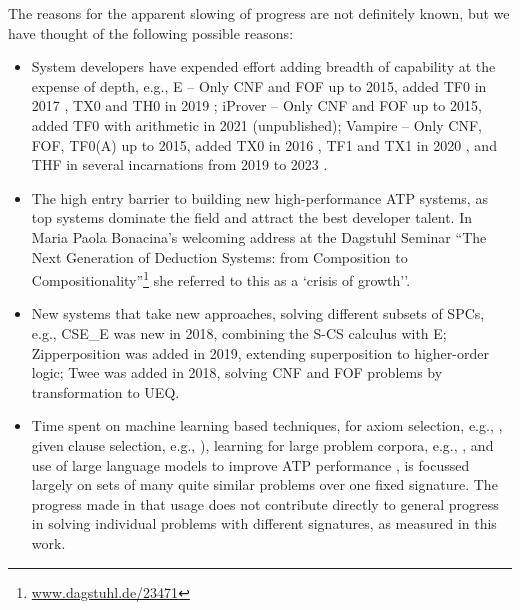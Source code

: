\documentclass[runningheads]{llncs}
\begin{document}
The reasons for the apparent slowing of progress are not definitely known, but we have thought of 
the following possible reasons:
\begin{itemize}
\item System developers have expended effort adding breadth of capability at the expense of 
      depth, e.g., 
      E -- Only CNF and FOF up to 2015, added TF0 in 2017 \cite{SCV19}, TX0 and TH0 in 2019 
           \cite{VB+19};
      iProver -- Only CNF and FOF up to 2015, added TF0 with arithmetic in 2021 (unpublished);
      Vampire -- Only CNF, FOF, TF0(A) up to 2015, added TX0 in 2016 \cite{KK+16}, 
           TF1 and TX1 in 2020 \cite{BR20-IJCAR}, and THF in several incarnations from 2019 to 
           2023 \cite{BR19,Bha20-Thesis,BRS23}.
\item The high entry barrier to building new high-performance ATP systems, as top systems
      dominate the field and attract the best developer talent.
      In Maria Paola Bonacina's welcoming address at the Dagstuhl Seminar ``The Next Generation 
      of Deduction Systems: from Composition to Compositionality''\footnote{%
      \href{https://www.dagstuhl.de/23471}{www.dagstuhl.de/23471}} she referred to this as a
     `crisis of growth''.
\item New systems that take new approaches, solving different subsets of SPCs, e.g.,
      CSE\_E \cite{XL+18} was new in 2018, combining the S-CS calculus with E;
      Zipperposition \cite{BB+21} was added in 2019, extending superposition to higher-order logic;
      Twee \cite{Sma21} was added in 2018, solving CNF and FOF problems by transformation to UEQ.
\item Time spent on machine learning based techniques, for axiom selection, e.g., 
      \cite{Urb06,KB14}, given clause selection, e.g., \cite{JU17-CICM,CA+21,AA+22-ML,MS23}), 
      learning for large problem corpora, e.g., \cite{KM+14,JU19,BL+19-ICML}, 
      and use of large language models to improve ATP performance \cite{WX+23,AS+23},
      is focussed largely on sets of many quite similar problems over one fixed signature.
      The progress made in that usage does not contribute directly to general progress in
      solving individual problems with different signatures, as measured in this work.

\end{itemize}
\end{document}
